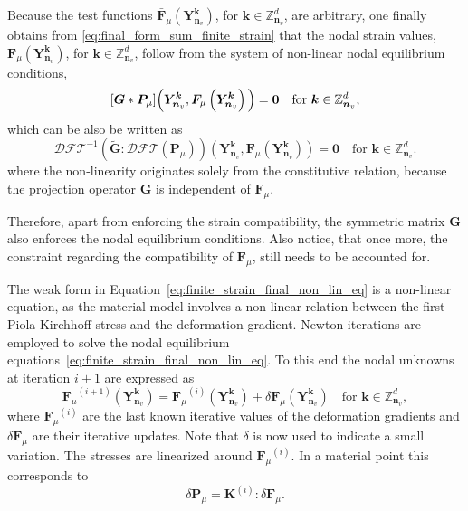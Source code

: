 Because the test functions \(\bar{\bm F}_\mu(\bm Y_{\bm n_v}^{\bm k})\), for \(\bm k\in \mathbb Z^{d}_{\bm n_v}\), are arbitrary, one finally obtains from \eqref{eq:final_form_sum_finite_strain} that the nodal strain values, \({\bm F}_\mu(\bm Y_{\bm n_v}^{\bm k})\), for \(\bm k\in \mathbb Z^{d}_{\bm n_v}\), follow from the system of non-linear nodal equilibrium conditions,
\begin{equation} \label{eq:final_form_sum}
[\bm G * \bm P_\mu]\Big(\bm Y_{\bm n_v}^{\bm k}, \bm F_\mu\left(\bm Y_{\bm n_v}^{\bm  k}\right)\Big)=\bm 0\quad \text{for \( \bm k \in \mathbb Z^d_{\bm n_v}\)},
\end{equation}
which can be also be written as
\begin{equation}\label{eq:finite_strain_final_non_lin_eq}
\mathcal{DFT}^{-1}\left(\tilde{\bm G}:\mathcal{DFT}\left(\bm P_\mu\right)\right)\left(\bm{Y}_{\bm n_v}^{\bm  k}, \bm F_\mu\left(\bm Y_{\bm n_v}^{\bm  k}\right)\right)= \bm 0\quad \text{for \(\bm k \in \mathbb Z^d_{\bm n_v}\)}.
\end{equation}
where the non-linearity originates solely from the constitutive relation, because the projection operator \(\bm G\) is independent of \(\bm F_\mu\).

Therefore, apart from enforcing the strain compatibility, the symmetric matrix \(\bm G\) also enforces the nodal equilibrium conditions.
Also notice, that once more, the constraint regarding the compatibility of \(\bm F_\mu\), still needs to be accounted for.

The weak form in Equation~\eqref{eq:finite_strain_final_non_lin_eq} is a non-linear equation, as the material model involves a non-linear relation between the first Piola-Kirchhoff stress and the deformation gradient.
Newton iterations are employed to solve the nodal equilibrium equations~\eqref{eq:finite_strain_final_non_lin_eq}.
To this end the nodal unknowns at iteration \(i+1\) are expressed as
\begin{equation} \label{eq:linearization_finite_strain}
{\bm{F}_\mu}^{(i+1)}\left(\bm Y_{\bm n_v}^{\bm  k}\right)={\bm{F}_\mu}^{(i)}\left(\bm Y_{\bm n_v}^{\bm  k}\right)+\delta {\bm{F}_\mu}\left(\bm Y_{\bm n_v}^{\bm  k}\right)\quad \text{for \(\bm k\in \mathbb Z^d_{\bm n_v}\)},
\end{equation}
where \({\bm{F}_\mu}^{(i)}\) are the last known iterative values of the deformation gradients and \(\delta {\bm{F}_\mu}\) are their iterative updates.
Note that \(\delta\) is now used to indicate a small variation.
The stresses are linearized around \({\bm{F}_\mu}^{(i)}\).
In a material point this corresponds to
\begin{equation} \label{eq:newton_increment}
\delta \bm{P}_\mu=\bm{K}^{(i)}: \delta \bm{F}_\mu.
\end{equation}

